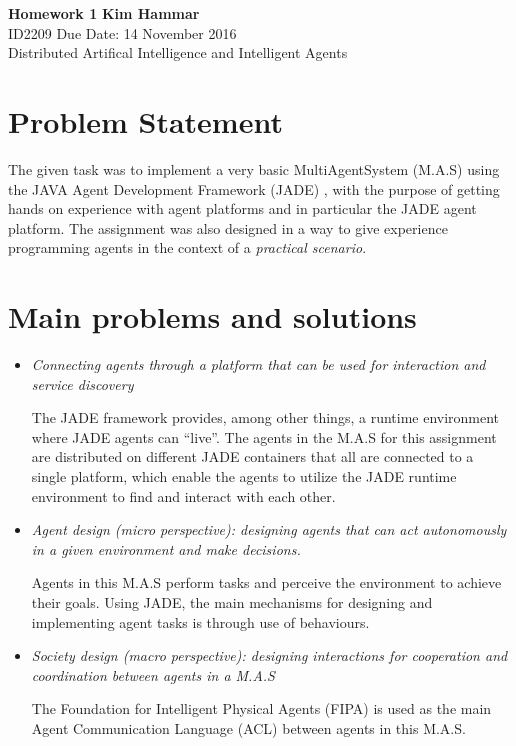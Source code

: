 \documentclass[a4paper, 11pt]{article}
\begin{document}
\noindent
\large\textbf{Homework 1} \hfill \textbf{Kim Hammar} \\
\normalsize ID2209 \hfill Due Date: 14 November 2016 \\
Distributed Artifical Intelligence and Intelligent Agents \hfill \\

\section*{Problem Statement}
The given task was to implement a very basic MultiAgentSystem (M.A.S) using the JAVA Agent Development Framework (JADE) \citep{jade}, with the purpose of getting hands on experience with agent platforms and in particular the JADE agent platform. The assignment was also designed in a way to give experience programming agents in the context of a \textit{practical scenario}.

\section*{Main problems and solutions}
\begin{itemize}
\item \textit{Connecting agents through a platform that can be used for interaction and service discovery}

The JADE framework provides, among other things, a runtime environment where JADE agents can ``live''. The agents in the M.A.S for this assignment are distributed on different JADE containers that all are connected to a single platform, which enable the agents to utilize the JADE runtime environment to find and interact with each other.

\item \textit{Agent design (micro perspective): designing agents that can act autonomously in a given environment and make decisions.}

Agents in this M.A.S perform tasks and perceive the environment to achieve their goals. Using JADE, the main mechanisms for designing and implementing agent tasks is through use of behaviours.
\item \textit{Society design (macro perspective): designing interactions for cooperation and coordination between agents in a M.A.S}

The Foundation for Intelligent Physical Agents (FIPA) is used as the main Agent Communication Language (ACL) between agents in this M.A.S.
\end{itemize}
\end{document}

